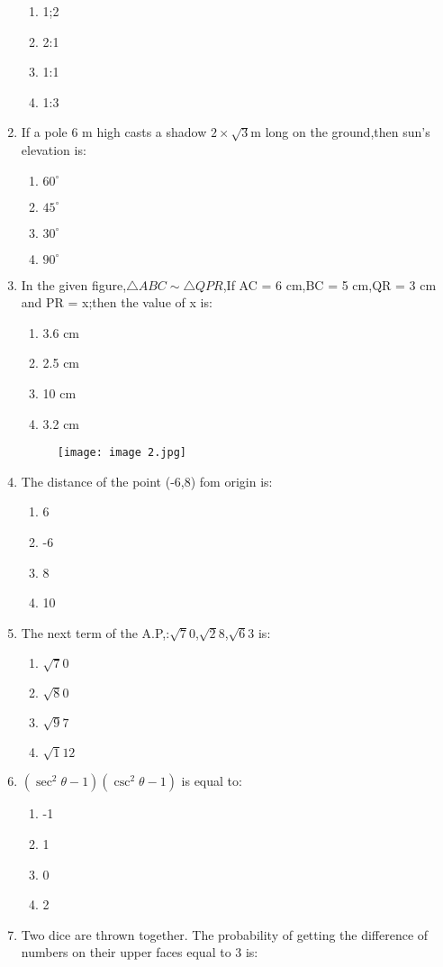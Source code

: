 \documentclass{article}
\begin{document}
\begin{enumerate}
	\begin{enumerate}
	\item 1;2
	\item 2:1
	\item 1:1
	\item 1:3
\end{enumerate}
\item If a pole 6 m high casts a shadow $2 \times \sqrt{3}$m long on the ground,then sun's elevation is:
	\begin{enumerate}
	\item $60^\circ$
	\item $45^\circ$
	\item $30^\circ$
	\item $90^\circ$
	\end{enumerate}
\item In the given figure,\(\triangle ABC \sim \triangle QPR\),If AC = 6 cm,BC = 5 cm,QR = 3 cm and PR = x;then the value of  x is:
	\begin{enumerate}
	\item 3.6 cm
	\item 2.5 cm
	\item 10 cm
	\item 3.2 cm
\end{enumerate}
\begin{figure}[h!]
\centering
\texttt{[image: image 2.jpg]}
\label{fig:image1}
\end{figure}
\item The distance of the point (-6,8) fom origin is:
	\begin{enumerate}
	\item 6
	\item -6
	\item 8
	\item 10
\end{enumerate}
\item The next term of the A.P,:$\sqrt 70$,$\sqrt 28$,$\sqrt 63$ is:
	\begin{enumerate}
        \item $\sqrt 70$
	\item $\sqrt 80$
	\item $\sqrt 97$
	\item $\sqrt 112$
\end{enumerate}
\item \((\sec^2 \theta - 1)(\csc^2 \theta - 1)\) 
is equal to:
\begin{enumerate}
	\item -1
	\item 1
	\item 0
	\item 2
\end{enumerate}
\item  Two dice are thrown together. The probability of getting the difference of numbers on their upper faces equal to 3 is:


\end{enumerate}
\end{document}
